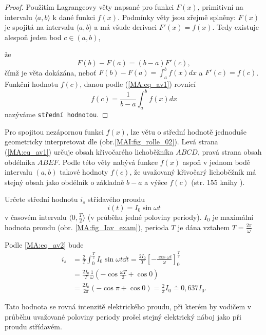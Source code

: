   \begin{proof} Použitím Lagrangeovy věty napsané pro funkci $F(x)$, primitivní na intervalu
    $\langle a, b\rangle$ k dané funkci $f(x)$. Podmínky věty jsou zřejmě splněny: $F(x)$ je
    spojitá na intervalu $\langle a, b\rangle$ a má všude derivaci $F'(x)= f(x)$. Tedy existuje
    alespoň jeden bod $c\in(a, b)$,
    
          
    
      že $$F(b)-F(a) = (b-a)F'(c),$$ čímž je věta dokázána, neboť $F(b)-F(a) = \int_a^bf(x)dx$ a
      $F'(c) = f(c)$. Funkční hodnotu $f(c)$, danou podle (\ref{MA:eq_av1}) rovnicí  
      \begin{equation}\label{MA:eq_av2}
         f(c) = \frac{1}{b-a}\int_a^b f(x)dx
      \end{equation}
      nazýváme \texttt{střední hodnotou}.
  \end{proof}

  Pro spojitou nezápornou funkci $f(x)$, lze větu o střední hodnotě jednoduše geometricky
  interpretovat dle (obr.\ref{MAI:fig_rolle_02}). Levá strana (\ref{MA:eq_av1}) určuje obsah
  křivočarého lichoběžníka $ABCD$, pravá strana obsah obdélníka $ABEF$. Podle této věty nabývá
  funkce $f(x)$ aspoň v jednom bodě intervalu $(a, b)$ takové hodnoty $f(c)$, že uvažovaný
  křivočarý lichoběžník má stejný obsah jako obdélník o základně $b-a$ a výšce $f(c)$ (str. 155
  knihy \cite{Knichal}).

  \begin{example} Určete střední hodnotu $i_s$ střídavého proudu $$i(t) = I_0\sin\omega t$$ v
    časovém intervalu $\langle 0, \frac{T}{2}\rangle$ (v průběhu jedné poloviny periody). $I_0$ je
    maximální hodnota proudu (obr. \ref{MA:fig_Iav_exam}), perioda $T$ je dána vztahem $T =
    \frac{2\pi}{\omega}$
        

    Podle \ref{MA:eq_av2} bude
    \begin{align*}
     i_s &=  \frac{2}{T}
             \int_0^{\frac{T}{2}}I_0\sin\omega t\dd{t} =
             \frac{2I_0}{T}\left[-\frac{\cos\omega t}{\omega}\right]_0^{\frac{T}{2}}        \\
         &=  \frac{2I_0}{T}\frac{1}{\omega}\left(-\cos\frac{\omega T}{2}+ \cos 0\right)     \\
         &=  \frac{2I_0}{2\pi}(-\cos\pi + \cos 0) = \frac{2}{\pi}I_0 \doteq 0,637 I_0.
  \end{align*}

  Tato hodnota se rovná intenzitě elektrického proudu, při kterém by vodičem v průběhu uvažované
  poloviny periody prošel stejný elektrický náboj jako při proudu střídavém.
  \end{example}

